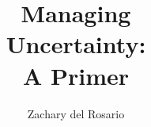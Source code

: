 \documentclass{tufte-book}
\title{Managing\\ \noindent Uncertainty:\\ \noindent
  A Primer} \author[del Rosario]{Zachary del Rosario}
\newcommand{\onlyinsubfile}[1]{#1}
\newcommand{\notinsubfile}[1]{}
\begin{document}
\renewcommand{\onlyinsubfile}[1]{}
\renewcommand{\notinsubfile}[1]{#1}

\frontmatter
\maketitle


\tableofcontents




\backmatter




\printindex
\end{document}
